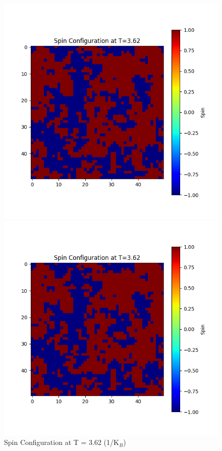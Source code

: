 \documentclass[11pt]{article}
\begin{document}
\begin{figure}[H]
    \centering
    \begin{minipage}{0.32\textwidth}
        \centering
        \includegraphics[width=\textwidth]{Spin_Configuration_at_T=3.62.png}
        \caption{Spin Configuration at T = 3.62 (1/K$_B$)}
        \label{fig:13}
    \end{minipage}\hfill
    \begin{minipage}{0.32\textwidth}
        \centering
        \includegraphics[width=\textwidth]{Spin_Configuration_at_T=3.62.png}

\end{minipage}
\end{figure}
\end{document}
